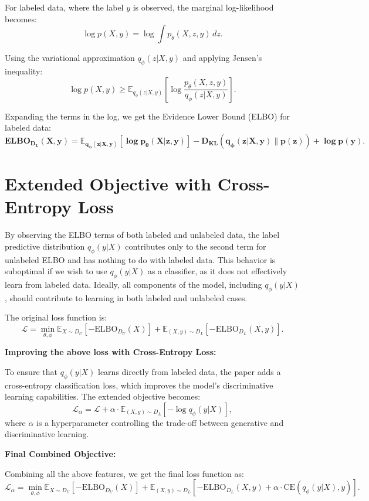 \documentclass{article}
\begin{document}
For labeled data, where the label $y$ is observed, the marginal log-likelihood becomes:
\[
\log p(X, y) = \log \int p_\theta(X, z, y) \, dz.
\]

Using the variational approximation $q_\phi(z|X, y)$ and applying Jensen's inequality:
\[
\log p(X, y) \geq \mathbb{E}_{q_\phi(z|X, y)} \left[ \log \frac{p_\theta(X, z, y)}{q_\phi(z|X, y)} \right].
\]

Expanding the terms in the log, we get the Evidence Lower Bound (ELBO) for labeled data:
\[
\bm{\text{ELBO}_{D_L}(X, y) = \mathbb{E}_{q_\phi(z|X, y)}[\log p_\theta(X|z, y)] 
- D_{\text{KL}}(q_\phi(z|X, y) \| p(z)) + \log p(y).} \tag{6}
\]

\section*{Extended Objective with Cross-Entropy Loss}

By observing the ELBO terms of both labeled and unlabeled data, the label predictive distribution $q_\phi(y|X)$ contributes only to the second term for unlabeled ELBO and has nothing to do with labeled data. This behavior is suboptimal if we wish to use $q_\phi(y|X)$ as a classifier, as it does not effectively learn from labeled data. Ideally, all components of the model, including $q_\phi(y|X)$, should contribute to learning in both labeled and unlabeled cases.

The original loss function is:
\[
\mathcal{L} = \min_{\theta, \phi} \mathbb{E}_{X \sim D_U}[-\text{ELBO}_{D_U}(X)] 
+ \mathbb{E}_{(X, y) \sim D_L}[-\text{ELBO}_{D_L}(X, y)]. \tag{6}
\]

\textbf{Improving the above loss with Cross-Entropy Loss:}

To ensure that $q_\phi(y|X)$ learns directly from labeled data, the paper adds a cross-entropy classification loss, which improves the model's discriminative learning capabilities. The extended objective becomes:
\[
\mathcal{L}_\alpha = \mathcal{L} + \alpha \cdot \mathbb{E}_{(X, y) \sim D_L}[-\log q_\phi(y|X)], \tag{7}
\]
where $\alpha$ is a hyperparameter controlling the trade-off between generative and discriminative learning.

\textbf{Final Combined Objective:}

Combining all the above features, we get the final loss function as:
\[
\boxed{\mathcal{L}_\alpha = \min_{\theta, \phi} \mathbb{E}_{X \sim D_U}[-\text{ELBO}_{D_U}(X)] 
+ \mathbb{E}_{(X, y) \sim D_L}[-\text{ELBO}_{D_L}(X, y) + \alpha \cdot \text{CE}(q_\phi(y|X), y)].} \tag{8}
\]
\end{document}

